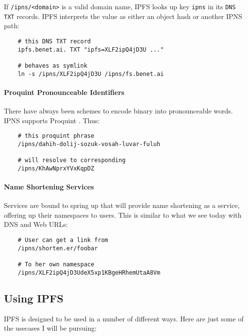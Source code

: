\documentclass{sig-alternate}
\begin{document}
If \texttt{/ipns/<domain>} is a valid domain name, IPFS
looks up key \texttt{ipns} in its \texttt{DNS TXT} records. IPFS
interprets the value as either an object hash or another IPNS path:

\begin{verbatim}
    # this DNS TXT record
    ipfs.benet.ai. TXT "ipfs=XLF2ipQ4jD3U ..."

    # behaves as symlink
    ln -s /ipns/XLF2ipQ4jD3U /ipns/fs.benet.ai
\end{verbatim}


\paragraph{Proquint Pronounceable Identifiers}

There have always been schemes to encode binary into pronounceable words. IPNS supports Proquint \cite{Proquint}. Thus:

\begin{verbatim}
    # this proquint phrase
    /ipns/dahih-dolij-sozuk-vosah-luvar-fuluh

    # will resolve to corresponding
    /ipns/KhAwNprxYVxKqpDZ
\end{verbatim}

\paragraph{Name Shortening Services}

Services are bound to spring up that will provide name shortening as a service, offering up their namespaces to users. This is similar to what we see today with DNS and Web URLs:

\begin{verbatim}
    # User can get a link from
    /ipns/shorten.er/foobar

    # To her own namespace
    /ipns/XLF2ipQ4jD3UdeX5xp1KBgeHRhemUtaA8Vm
\end{verbatim}

\subsection{Using IPFS}

IPFS is designed to be used in a number of different ways. Here are just some of the usecases I will be pursuing:
\end{document}
